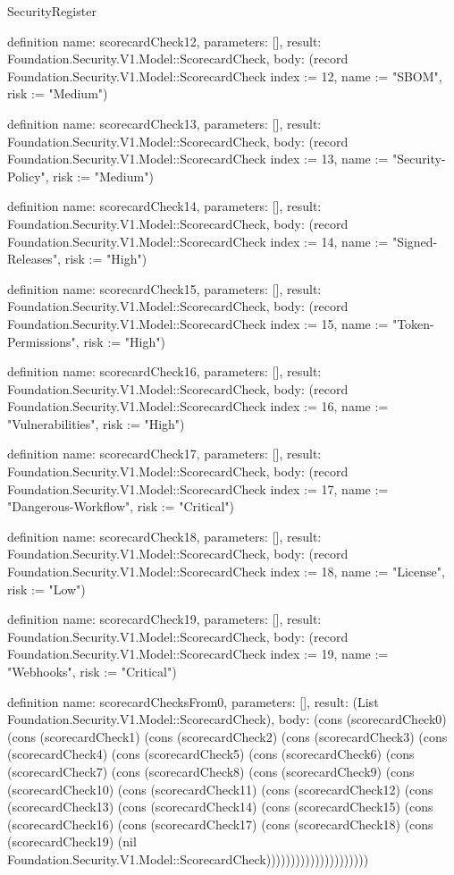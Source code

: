 \begin{lexlean}{SecurityRegister}
\begin{semanticmodule}
definition{
  name: scorecardCheck12,
  parameters: [],
  result: Foundation.Security.V1.Model::ScorecardCheck,
  body: (record Foundation.Security.V1.Model::ScorecardCheck {index := 12, name := "SBOM", risk := "Medium"})
}

definition{
  name: scorecardCheck13,
  parameters: [],
  result: Foundation.Security.V1.Model::ScorecardCheck,
  body: (record Foundation.Security.V1.Model::ScorecardCheck {index := 13, name := "Security-Policy", risk := "Medium"})
}

definition{
  name: scorecardCheck14,
  parameters: [],
  result: Foundation.Security.V1.Model::ScorecardCheck,
  body: (record Foundation.Security.V1.Model::ScorecardCheck {index := 14, name := "Signed-Releases", risk := "High"})
}

definition{
  name: scorecardCheck15,
  parameters: [],
  result: Foundation.Security.V1.Model::ScorecardCheck,
  body: (record Foundation.Security.V1.Model::ScorecardCheck {index := 15, name := "Token-Permissions", risk := "High"})
}

definition{
  name: scorecardCheck16,
  parameters: [],
  result: Foundation.Security.V1.Model::ScorecardCheck,
  body: (record Foundation.Security.V1.Model::ScorecardCheck {index := 16, name := "Vulnerabilities", risk := "High"})
}

definition{
  name: scorecardCheck17,
  parameters: [],
  result: Foundation.Security.V1.Model::ScorecardCheck,
  body: (record Foundation.Security.V1.Model::ScorecardCheck {index := 17, name := "Dangerous-Workflow", risk := "Critical"})
}

definition{
  name: scorecardCheck18,
  parameters: [],
  result: Foundation.Security.V1.Model::ScorecardCheck,
  body: (record Foundation.Security.V1.Model::ScorecardCheck {index := 18, name := "License", risk := "Low"})
}

definition{
  name: scorecardCheck19,
  parameters: [],
  result: Foundation.Security.V1.Model::ScorecardCheck,
  body: (record Foundation.Security.V1.Model::ScorecardCheck {index := 19, name := "Webhooks", risk := "Critical"})
}

definition{
  name: scorecardChecksFrom0,
  parameters: [],
  result: (List Foundation.Security.V1.Model::ScorecardCheck),
  body: (cons (scorecardCheck0) (cons (scorecardCheck1) (cons (scorecardCheck2) (cons (scorecardCheck3) (cons (scorecardCheck4) (cons (scorecardCheck5) (cons (scorecardCheck6) (cons (scorecardCheck7) (cons (scorecardCheck8) (cons (scorecardCheck9) (cons (scorecardCheck10) (cons (scorecardCheck11) (cons (scorecardCheck12) (cons (scorecardCheck13) (cons (scorecardCheck14) (cons (scorecardCheck15) (cons (scorecardCheck16) (cons (scorecardCheck17) (cons (scorecardCheck18) (cons (scorecardCheck19) (nil Foundation.Security.V1.Model::ScorecardCheck)))))))))))))))))))))
}


\end{semanticmodule}
\end{lexlean}
